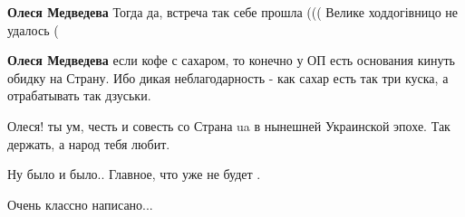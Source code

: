 \begin{itemize}
\begin{itemize}
\textbf{Олеся Медведева} Тогда да, встреча так себе прошла ((( Велике ходдогівницо не удалось (

\textbf{Олеся Медведева} если кофе с сахаром, то конечно у ОП есть основания кинуть обидку на Страну. Ибо дикая неблагодарность - как сахар есть так три куска, а отрабатывать так дзуськи.
\end{itemize} %

Олеся! ты ум, честь и совесть со Страна ua в нынешней Украинской эпохе. Так держать, а народ тебя любит.

Ну было и было..
Главное, что уже не будет
.

Очень классно написано...

\end{itemize} %
